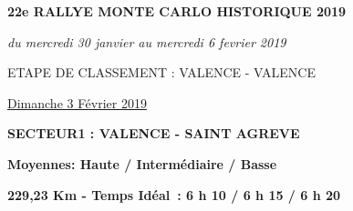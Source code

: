\documentclass{article}%
\begin{document}
%
\normalsize%
\begin{center} \textbf{\LARGE{22e RALLYE MONTE CARLO HISTORIQUE 2019}} \end{center}%
\begin{center} \textit{du mercredi 30 janvier au mercredi 6 fevrier 2019} \end{center}%
\begin{center} ETAPE DE CLASSEMENT : VALENCE - VALENCE							
 \end{center}%
\begin{flushright} \underline{Dimanche 3 Février 2019
} \end{flushright}%
\begin{flushleft} \textbf{SECTEUR1 : VALENCE - SAINT AGREVE} \end{flushleft}%
\begin{flushright} \textbf{             Moyennes: Haute / Intermédiaire / Basse
} \end{flushright}%
\begin{flushright} \textbf{229,23 Km - Temps Idéal : 6 h 10 / 6 h 15 / 6 h 20
} \end{flushright}%
\end{document}
